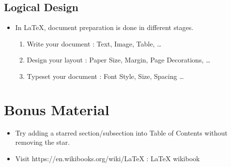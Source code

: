 \documentclass{article}
\begin{document}
\subsection{Logical Design}
\begin{itemize}
	\item In \LaTeX{}, document preparation is done in different stages.
		\begin{enumerate}
			\item Write your document : Text, Image, Table, \dots
			\item Design your layout  : Paper Size, Margin, Page Decorations, \dots
			\item Typeset your document : Font Style, Size, Spacing \dots
		\end{enumerate}
\end{itemize}

\section{Bonus Material}

\begin{itemize}
	\item Try adding a starred section/subsection into Table of Contents without removing the star.
	\item Visit https://en.wikibooks.org/wiki/LaTeX : \LaTeX{} wikibook
\end{itemize}


%
%
\end{document}
